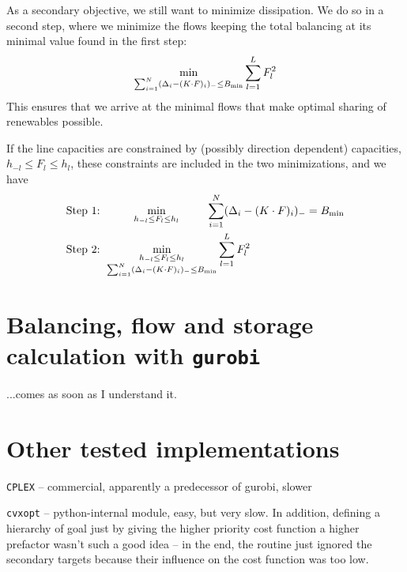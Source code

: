 \documentclass[english,twoside,a4paper,11pt]{article}
\numberwithin{equation}{section}
\begin{document}
As a secondary objective, we still want to minimize dissipation. We do
so in a second step, where we minimize the flows keeping the total
balancing at its minimal value found in the first step:
\begin{align*}
\min_{\sum_{i=1}^N (\Delta_i-(K\cdot F)_i)_- \leq B_{\rm min}}\sum_{l=1}^L F_l^2
\end{align*}
This ensures that we arrive at the minimal flows that make optimal
sharing of renewables possible.

If the line capacities are constrained by (possibly direction
dependent) capacities, $h_{-l}\leq F_l\leq h_l$, these constraints are
included in the two minimizations, and we have
\begin{align*}
\text{Step 1: }&\qquad \:\:
\min_{h_{-l}\leq F_l \leq h_l} \qquad \:\: 
\sum_{i=1}^N(\Delta_i-(K\cdot F)_i)_- = B_{\rm min}\\
\text{Step 2: }&
\min_{\substack{h_{-l}\leq F_l \leq h_l \\ \sum_{i=1}^N (\Delta_i-(K\cdot F)_i)_-
  \leq B_{\rm min}}} \sum_{l=1}^L F_l^2
\end{align*}

\section{Balancing, flow and storage calculation with \texttt{gurobi}}

...comes as soon as I understand it.

\section{Other tested implementations}

\texttt{CPLEX} -- commercial, apparently a predecessor of gurobi,
slower

\texttt{cvxopt} -- python-internal module, easy, but very slow. In
addition, defining a hierarchy of goal just by giving the higher
priority cost function a higher prefactor wasn't such a good idea --
in the end, the routine just ignored the secondary targets because
their influence on the cost function was too low.

\end{document}
